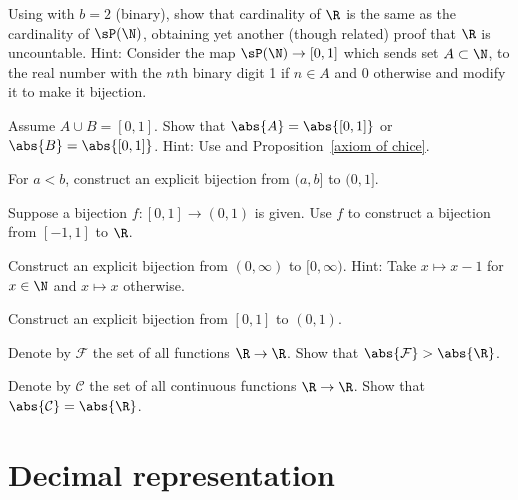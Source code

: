 \documentclass[12pt]{book}
\begin{document}
\begin{exercise}\label{ex:|P(N)|=|R|}
Using  with $b=2$ (binary), 
show that cardinality of $\R$ is the same as the cardinality of $\sP(\N)$,
obtaining yet another (though related) proof that $\R$ is uncountable.
Hint: Consider the map $\sP(\N)\to[0,1]$ which sends
set $A \subset \N$, to the real number with the $n$th binary digit 1 if $n\in A$ and $0$ otherwise and modify it to make it bijection.
\end{exercise}

\begin{exercise}[Challenging]
Assume $A\cup B=[0,1]$. 
Show that $\abs{A}=\abs{[0,1]}$ or $\abs{B}=\abs{[0,1]}$.
Hint: Use  and Proposition~\ref{axiom of chice}.
\end{exercise}

\begin{exercise}
For $a < b$, construct an explicit bijection from $(a,b]$ to $(0,1]$.
\end{exercise}

\begin{exercise}
Suppose a bijection $f \colon [0,1] \to (0,1)$ is given.
Use $f$ to construct a
bijection from $[-1,1]$ to $\R$.
\end{exercise}

\begin{exercise}
Construct an explicit bijection from $(0,\infty)$ to $[0,\infty)$.
Hint: Take $x\mapsto x-1$ for $x\in\N$ and $x\mapsto x$ otherwise.
\end{exercise}

\begin{exercise}[Hard]
Construct an explicit bijection from $[0,1]$ to $(0,1)$.
\end{exercise}

\begin{exercise}
Denote by $\mathcal{F}$ the set of all functions $\R\to\R$. 
Show that $\abs{\mathcal{F}}>\abs{\R}$.
\end{exercise}

\begin{exercise}
Denote by $\mathcal{C}$ the set of all continuous functions $\R\to\R$. 
Show that $\abs{\mathcal{C}}=\abs{\R}$.
\end{exercise}



\sectionnewpage
\section{Decimal representation}
\label{sec:decimals}
\end{document}
